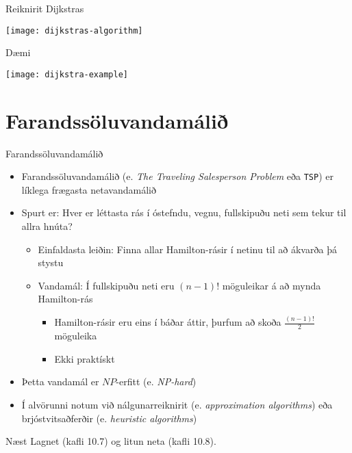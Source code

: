 \documentclass[handout]{beamer}
\begin{document}
\begin{frame}{Reiknirit Dijkstras}
\begin{center}
\texttt{[image: dijkstras-algorithm]}
\end{center}
\end{frame}

\begin{frame}{Dæmi}
\begin{center}
\texttt{[image: dijkstra-example]}
\end{center}
\end{frame}

\section{Farandssöluvandamálið}

\begin{frame}{Farandssöluvandamálið}
\begin{itemize}
 \item Farandssöluvandamálið (e. \emph{The Traveling Salesperson Problem} eða \texttt{TSP}) er líklega frægasta netavandamálið
 \item Spurt er: Hver er léttasta rás í óstefndu, vegnu, fullskipuðu neti sem tekur til allra hnúta? \pause
 \begin{itemize}
  \item Einfaldasta leiðin: Finna allar Hamilton-rásir í netinu til að ákvarða þá stystu
  \item Vandamál: Í fullskipuðu neti eru $(n-1)!$ möguleikar á að mynda Hamilton-rás
  \begin{itemize}
   \item Hamilton-rásir eru eins í báðar áttir, þurfum að skoða $\frac{(n-1)!}{2}$ möguleika
   \item Ekki praktískt
  \end{itemize}
 \end{itemize}
 \item Þetta vandamál er $NP$-erfitt (e. \emph{NP-hard})
 \item Í alvörunni notum við nálgunarreiknirit (e. \emph{approximation algorithms}) eða brjóstvitsaðferðir (e. \emph{heuristic algorithms})
\end{itemize}
\end{frame}


\begin{frame}{Næst}
Lagnet (kafli 10.7) og litun neta (kafli 10.8).
\end{frame}
\end{document}
